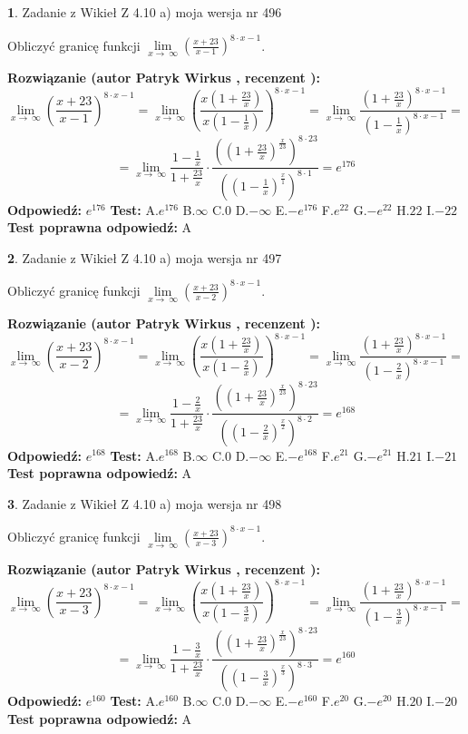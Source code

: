 \documentclass[12pt, a4paper]{article}
\theoremstyle{definition} %
\newtheorem{zad}{}
\newcommand{\zadStart}[1]{\begin{zad}#1\newline}
\newcommand{\zadStop}{\end{zad}}
\newcommand{\rozwStart}[2]{\noindent \textbf{Rozwiązanie (autor #1 , recenzent #2): }\newline}
\newcommand{\rozwStop}{\newline}
\newcommand{\odpStart}{\noindent \textbf{Odpowiedź:}\newline}
\newcommand{\odpStop}{\newline}
\newcommand{\testStart}{\noindent \textbf{Test:}\newline}
\newcommand{\testStop}{\newline}
\newcommand{\kluczStart}{\noindent \textbf{Test poprawna odpowiedź:}\newline}
\newcommand{\kluczStop}{\newline}
\begin{document}
\zadStart{Zadanie z Wikieł Z 4.10 a) moja wersja nr 496}

Obliczyć granicę funkcji  $\lim\limits_{x\to\ \infty}(\frac{x+23}{x-1})^{8\cdot x-1}$.
\zadStop
\rozwStart{Patryk Wirkus}{}
$$\lim\limits_{x\to\ \infty}(\frac{x+23}{x-1})^{8\cdot x-1} = \lim\limits_{x\to\ \infty}(\frac{x(1+\frac{23}{x})}{x(1-\frac{1}{x})})^{8\cdot x-1}=\lim\limits_{x\to\ \infty}\frac{(1+\frac{23}{x})^{8\cdot x-1}}{(1-\frac{1}{x})^{8\cdot x-1}}=$$
$$=\lim\limits_{x\to\ \infty}\frac{1-\frac{1}{x}}{1+\frac{23}{x}}\cdot\frac{((1+\frac{23}{x})^{\frac{x}{23}})^{8\cdot23}}{((1-\frac{1}{x})^{\frac{x}{1}})^{8\cdot1}}=e^{176}$$
\rozwStop
\odpStart
$e^{176}$
\odpStop
\testStart
A.$e^{176}$ B.$\infty$ C.$0$ D.$-\infty$ E.$-e^{176}$
F.$e^{22}$ G.$-e^{22}$
H.$22$
I.$-22$
\testStop
\kluczStart
A
\kluczStop



\zadStart{Zadanie z Wikieł Z 4.10 a) moja wersja nr 497}

Obliczyć granicę funkcji  $\lim\limits_{x\to\ \infty}(\frac{x+23}{x-2})^{8\cdot x-1}$.
\zadStop
\rozwStart{Patryk Wirkus}{}
$$\lim\limits_{x\to\ \infty}(\frac{x+23}{x-2})^{8\cdot x-1} = \lim\limits_{x\to\ \infty}(\frac{x(1+\frac{23}{x})}{x(1-\frac{2}{x})})^{8\cdot x-1}=\lim\limits_{x\to\ \infty}\frac{(1+\frac{23}{x})^{8\cdot x-1}}{(1-\frac{2}{x})^{8\cdot x-1}}=$$
$$=\lim\limits_{x\to\ \infty}\frac{1-\frac{2}{x}}{1+\frac{23}{x}}\cdot\frac{((1+\frac{23}{x})^{\frac{x}{23}})^{8\cdot23}}{((1-\frac{2}{x})^{\frac{x}{2}})^{8\cdot2}}=e^{168}$$
\rozwStop
\odpStart
$e^{168}$
\odpStop
\testStart
A.$e^{168}$ B.$\infty$ C.$0$ D.$-\infty$ E.$-e^{168}$
F.$e^{21}$ G.$-e^{21}$
H.$21$
I.$-21$
\testStop
\kluczStart
A
\kluczStop



\zadStart{Zadanie z Wikieł Z 4.10 a) moja wersja nr 498}

Obliczyć granicę funkcji  $\lim\limits_{x\to\ \infty}(\frac{x+23}{x-3})^{8\cdot x-1}$.
\zadStop
\rozwStart{Patryk Wirkus}{}
$$\lim\limits_{x\to\ \infty}(\frac{x+23}{x-3})^{8\cdot x-1} = \lim\limits_{x\to\ \infty}(\frac{x(1+\frac{23}{x})}{x(1-\frac{3}{x})})^{8\cdot x-1}=\lim\limits_{x\to\ \infty}\frac{(1+\frac{23}{x})^{8\cdot x-1}}{(1-\frac{3}{x})^{8\cdot x-1}}=$$
$$=\lim\limits_{x\to\ \infty}\frac{1-\frac{3}{x}}{1+\frac{23}{x}}\cdot\frac{((1+\frac{23}{x})^{\frac{x}{23}})^{8\cdot23}}{((1-\frac{3}{x})^{\frac{x}{3}})^{8\cdot3}}=e^{160}$$
\rozwStop
\odpStart
$e^{160}$
\odpStop
\testStart
A.$e^{160}$ B.$\infty$ C.$0$ D.$-\infty$ E.$-e^{160}$
F.$e^{20}$ G.$-e^{20}$
H.$20$
I.$-20$
\testStop
\kluczStart
A
\kluczStop
\end{document}
